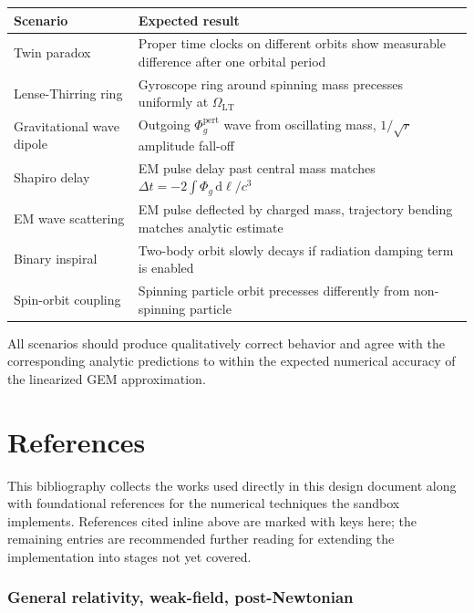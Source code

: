 \documentclass[11pt,a4paper]{article}
\newcommand{\Phig}{\Phi_g}
\newcommand{\dd}{\mathrm{d}}
\begin{document}
\begin{center}
\begin{tabular}{@{}L{4.5cm}L{7cm}@{}}
\toprule
\textbf{Scenario} & \textbf{Expected result} \\
\midrule
Twin paradox & Proper time clocks on different orbits show measurable difference after one orbital period \\
Lense-Thirring ring & Gyroscope ring around spinning mass precesses uniformly at $\Omega_{\mathrm{LT}}$ \\
Gravitational wave dipole & Outgoing $\Phig^{\mathrm{pert}}$ wave from oscillating mass, $1/\sqrt{r}$ amplitude fall-off \\
Shapiro delay & EM pulse delay past central mass matches $\Delta t = -2\int\Phig\,\dd\ell/c^3$ \\
EM wave scattering & EM pulse deflected by charged mass, trajectory bending matches analytic estimate \\
Binary inspiral & Two-body orbit slowly decays if radiation damping term is enabled \\
Spin-orbit coupling & Spinning particle orbit precesses differently from non-spinning particle \\
\bottomrule
\end{tabular}
\end{center}

All scenarios should produce qualitatively correct behavior and agree with the corresponding analytic predictions to within the expected numerical accuracy of the linearized GEM approximation.

\section{References}
\label{sec:refs}

This bibliography collects the works used directly in this design
document along with foundational references for the numerical techniques
the sandbox implements.  References cited inline above are marked with
keys here; the remaining entries are recommended further reading for
extending the implementation into stages not yet covered.

\subsubsection*{General relativity, weak-field, post-Newtonian}
\end{document}

